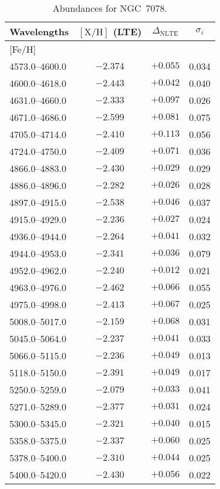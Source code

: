 \documentclass{aa}
\begin{document}
\begin{appendix}
\begin{table}
\caption{Abundances for NGC~7078.}
{\tiny
\begin{tabular}{lccc} \\ \hline\hline
Wavelengths & $\mathrm{[X/H]}$ (LTE) & $\Delta_\mathrm{NLTE}$ & $\sigma_i$ \\ \hline
% 
\mbox{[Fe/H]} \\
4573.0--4600.0 & $-2.374$ & $+0.055$ & 0.034 \\
4600.0--4618.0 & $-2.443$ & $+0.042$ & 0.040 \\
4631.0--4660.0 & $-2.333$ & $+0.097$ & 0.026 \\
4671.0--4686.0 & $-2.599$ & $+0.081$ & 0.075 \\
4705.0--4714.0 & $-2.410$ & $+0.113$ & 0.056 \\
4724.0--4750.0 & $-2.409$ & $+0.071$ & 0.036 \\
4866.0--4883.0 & $-2.430$ & $+0.029$ & 0.029 \\
4886.0--4896.0 & $-2.282$ & $+0.026$ & 0.028 \\
4897.0--4915.0 & $-2.538$ & $+0.046$ & 0.037 \\
4915.0--4929.0 & $-2.236$ & $+0.027$ & 0.024 \\
4936.0--4944.0 & $-2.264$ & $+0.041$ & 0.032 \\
4944.0--4953.0 & $-2.341$ & $+0.036$ & 0.079 \\
4952.0--4962.0 & $-2.240$ & $+0.012$ & 0.021 \\
4963.0--4976.0 & $-2.462$ & $+0.066$ & 0.055 \\
4975.0--4998.0 & $-2.413$ & $+0.067$ & 0.025 \\
5008.0--5017.0 & $-2.159$ & $+0.068$ & 0.031 \\
5045.0--5064.0 & $-2.237$ & $+0.041$ & 0.033 \\
5066.0--5115.0 & $-2.236$ & $+0.049$ & 0.013 \\
5118.0--5150.0 & $-2.391$ & $+0.049$ & 0.017 \\
5250.0--5259.0 & $-2.079$ & $+0.033$ & 0.041 \\
5271.0--5289.0 & $-2.377$ & $+0.031$ & 0.024 \\
5300.0--5345.0 & $-2.321$ & $+0.040$ & 0.015 \\
5358.0--5375.0 & $-2.337$ & $+0.060$ & 0.025 \\
5378.0--5400.0 & $-2.310$ & $+0.044$ & 0.025 \\
5400.0--5420.0 & $-2.430$ & $+0.056$ & 0.022 \\

\end{tabular}}
\end{table}
\end{appendix}
\end{document}
